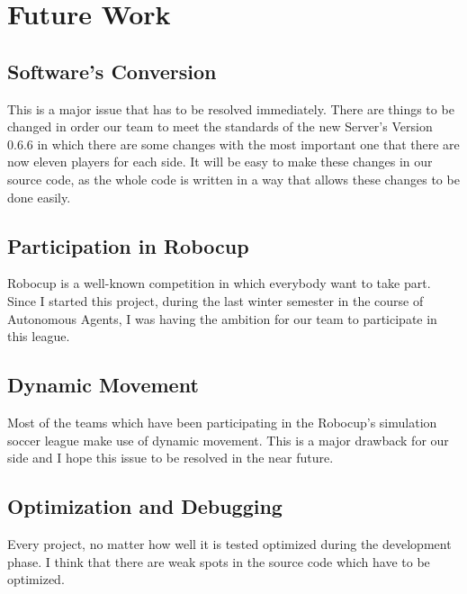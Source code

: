 \chapter{Future Work}
\label{future}

\section{Software's Conversion}
This is a major issue that has to be resolved immediately. There are things to be changed in order our team to meet the standards of the new Server's Version 0.6.6 in which there are some changes with the most important one that there are now eleven players for each side. It will be easy to make these changes in our source code, as the whole code is written in a way that allows these changes to be done easily.


\section{Participation in Robocup}
Robocup is a well-known competition in which everybody want to take part.
Since I started this project, during the last winter semester in the course of Autonomous Agents, I was having the ambition for our team to participate in this league.

\section{Dynamic Movement}
Most of the teams which have been participating in the Robocup's simulation soccer league make use of dynamic movement. This is a major drawback
for our side and I hope this issue to be resolved in the near future.

\section{Optimization and Debugging}
Every project, no matter how well it is tested optimized during the development phase. I think that there are weak spots in the source code which have to be optimized.